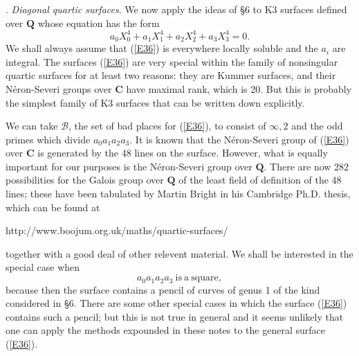 \documentclass[12pt]{article}
\def\bC{{\mathbf C}}
\def\bQ{{\mathbf Q}}
\def\sB{{\mathcal B}}
\def\beq{\begin{equation} \label}
\begin{document}
\newpage

. \emph{Diagonal quartic surfaces}. \newline
We now apply the ideas of \S6 to K3 surfaces defined over $\bQ$ whose
equation has the form
\beq{E36} a_0X_0^4+a_1X_1^4+a_2X_2^4+a_3X_3^4=0. \end{equation}
We shall always assume that (\ref{E36}) is everywhere locally
soluble and the $a_i$ are integral. The surfaces (\ref{E36})
are very special within the
family of nonsingular quartic surfaces for at least two
reasons: they are Kummer surfaces, and their N\'{e}ron-Severi
groups over $\bC$ have maximal rank, which is 20. But this is
probably the simplest family of K3 surfaces that can be
written down explicitly.

We can take $\sB$, the set of bad places for (\ref{E36}), to
consist of $\infty,2$ and the odd primes which divide
$a_0a_1a_2a_3$.
It is known that the N\'{e}ron-Severi group of (\ref{E36}) over $\bC$ is
generated by the 48 lines on the surface. However, what is equally important
for our purposes is the N\'{e}ron-Severi group over $\bQ$. There are now 282
possibilities for the Galois group over $\bQ$ of the least field of definition
of the 48 lines; these have been tabulated by Martin Bright in his Cambridge
Ph.D. thesis, which can be found at
\newline \begin{center} http://www.boojum.org.uk/maths/quartic-surfaces/
\end{center} 
together with a good deal of other relevent material. We shall be interested
in the special case when
\beq{E44} a_0a_1a_2a_3 {\mathrm{~is~a~square}}, \end{equation}
because then the surface contains a pencil of curves of genus 1 of the kind
considered in \S6. There are some other special cases in which the surface
(\ref{E36}) contains such a pencil; but this is not true in
general and it seems unlikely that one can apply the methods
expounded in these notes to the general surface (\ref{E36}).
\end{document}
